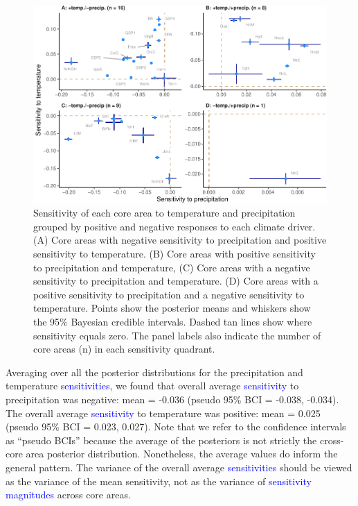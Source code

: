 \documentclass[
  12pt,
]{article}
\begin{document}
\begin{figure}
\centering
\includegraphics{sageCastManuscript_files/figure-latex/sen-scatter-1.pdf}
\caption{\label{fig:sen-scatter}Sensitivity of each core area to temperature and precipitation grouped by positive and negative responses to each climate driver. (A) Core areas with negative sensitivity to precipitation and positive sensitivity to temperature. (B) Core areas with positive sensitivity to precipitation and temperature, (C) Core areas with a negative sensitivity to precipitation and temperature. (D) Core areas with a positive sensitivity to precipitation and a negative sensitivity to temperature. Points show the posterior means and whiskers show the 95\% Bayesian credible intervals. Dashed tan lines show where sensitivity equals zero. The panel labels also indicate the number of core areas (n) in each sensitivity quadrant.}
\end{figure}

Averaging over all the posterior distributions for the precipitation and temperature \textcolor{blue}{sensitivities}, we found that overall average \textcolor{blue}{sensitivity} to precipitation was negative: mean = -0.036 (pseudo 95\% BCI = -0.038, -0.034).
The overall average \textcolor{blue}{sensitivity} to temperature was positive: mean = 0.025 (pseudo 95\% BCI = 0.023, 0.027).
Note that we refer to the confidence intervals as ``pseudo BCIs'' because the average of the posteriors is not strictly the cross-core area posterior distribution.
Nonetheless, the average values do inform the general pattern.
The variance of the overall average \textcolor{blue}{sensitivities} should be viewed as the variance of the mean sensitivity, not as the variance of \textcolor{blue}{sensitivity magnitudes} across core areas.
\end{document}
